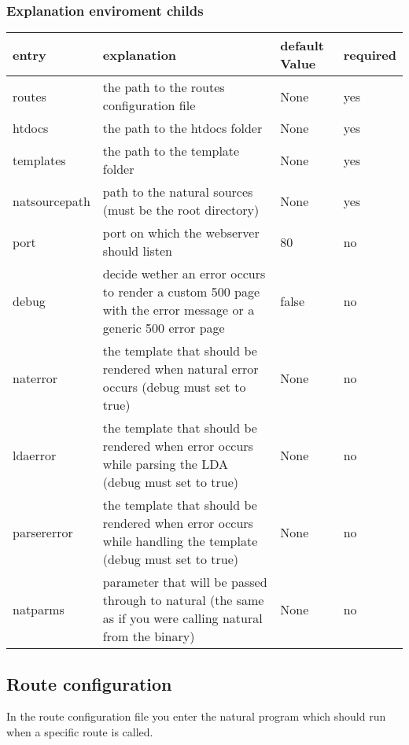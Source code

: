 \documentclass[letterpaper,10pt,english]{sphinxmanual}
\begin{document}
\subsubsection{Explanation enviroment childs}
\label{webserver:explanation-enviroment-childs}
\noindent\begin{tabulary}{\linewidth}{|L|L|L|L|}
\hline
\textsf{\relax 
entry
\unskip}\relax &\textsf{\relax 
explanation
\unskip}\relax &\textsf{\relax 
default Value
\unskip}\relax &\textsf{\relax 
required
\unskip}\relax \\
\hline
routes
&
the path to the routes configuration file
&
None
&
yes
\\
\hline
htdocs
&
the path to the htdocs folder
&
None
&
yes
\\
\hline
templates
&
the path to the template folder
&
None
&
yes
\\
\hline
natsourcepath
&
path to the natural sources (must be the root directory)
&
None
&
yes
\\
\hline
port
&
port on which the webserver should listen
&
80
&
no
\\
\hline
debug
&
decide wether an error occurs to render a custom 500 page with the error message or a generic 500 error page
&
false
&
no
\\
\hline
naterror
&
the template that should be rendered when natural error occurs (debug must set to true)
&
None
&
no
\\
\hline
ldaerror
&
the template that should be rendered when error occurs while parsing the LDA (debug must set to true)
&
None
&
no
\\
\hline
parsererror
&
the template that should be rendered when error occurs while handling the template (debug must set to true)
&
None
&
no
\\
\hline
natparms
&
parameter that will be passed through to natural (the same as if you were calling natural from the binary)
&
None
&
no
\\
\hline\end{tabulary}



\subsection{Route configuration}
\label{webserver:route-configuration}
In the route configuration file you enter the natural program which should run when a specific route is called.
\end{document}
